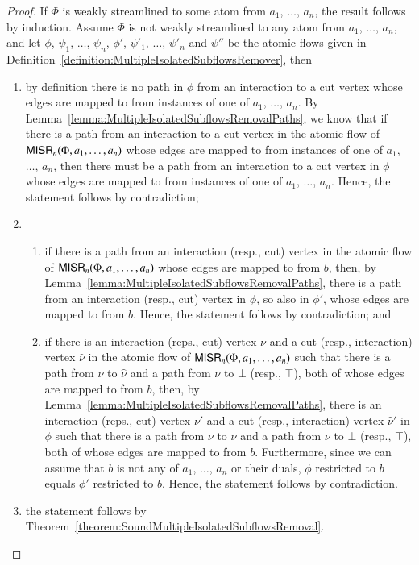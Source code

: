\begin{proof}
If $\Phi$ is weakly streamlined to some atom from $a_1$, $\dots$, $a_n$, the result follows by induction. Assume $\Phi$ is not weakly streamlined to any atom from $a_1$, $\dots$, $a_n$, and let $\phi$, $\psi_1$, $\dots$, $\psi_n$, $\phi'$, $\psi'_1$, $\dots$, $\psi'_n$ and $\psi''$ be the atomic flows given in Definition~\ref{definition:MultipleIsolatedSubflowsRemover}, then
\begin{enumerate}
\item by definition there is no path in $\phi$ from an interaction to a cut vertex whose edges are mapped to from instances of one of $a_1$, $\dots$, $a_n$. By Lemma~\vref{lemma:MultipleIsolatedSubflowsRemovalPaths}, we know that if there is a path from an interaction to a cut vertex in the atomic flow of $\mathsf{MISR}_n(\Phi,a_1,\dots,a_n)$ whose edges are mapped to from instances of one of $a_1$, $\dots$, $a_n$, then there must be a path from an interaction to a cut vertex in $\phi$ whose edges are mapped to from instances of one of $a_1$, $\dots$, $a_n$. Hence, the statement follows by contradiction;
\item
\begin{enumerate}
 \item if there is a path from an interaction (resp., cut) vertex in the atomic flow of $\mathsf{MISR}_n(\Phi,a_1,\dots,a_n)$ whose edges are mapped to from $b$, then, by Lemma~\ref{lemma:MultipleIsolatedSubflowsRemovalPaths}, there is a path from an interaction (resp., cut) vertex in $\phi$, so also in $\phi'$, whose edges are mapped to from $b$. Hence, the statement follows by contradiction; and
 \item if there is an interaction (reps., cut) vertex $\nu$ and a cut (resp., interaction) vertex $\hat\nu$ in the atomic flow of $\mathsf{MISR}_n(\Phi,a_1,\dots,a_n)$ such that there is a path from $\nu$ to $\hat\nu$ and a path from $\nu$ to $\bot$ (resp., $\top$), both of whose edges are mapped to from $b$, then, by Lemma~\ref{lemma:MultipleIsolatedSubflowsRemovalPaths}, there is an interaction (reps., cut) vertex $\nu'$ and a cut (resp., interaction) vertex $\hat\nu'$ in $\phi$ such that there is a path from $\nu$ to $\hat\nu$ and a path from $\nu$ to $\bot$ (resp., $\top$), both of whose edges are mapped to from $b$. Furthermore, since we can assume that $b$ is not any of $a_1$, $\dots$, $a_n$ or their duals, $\phi$ restricted to $b$ equals $\phi'$ restricted to $b$. Hence, the statement follows by contradiction.
\end{enumerate}
\item the statement follows by Theorem~\vref{theorem:SoundMultipleIsolatedSubflowsRemoval}.
\end{enumerate}
\end{proof}

